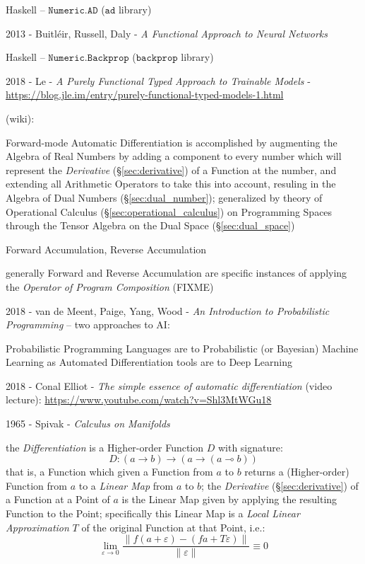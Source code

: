 Haskell -- $\mathtt{Numeric.AD}$ ($\mathtt{ad}$ library)

2013 - Buitl\'eir, Russell, Daly -
\emph{A Functional Approach to Neural Networks}

Haskell -- $\mathtt{Numeric.Backprop}$ ($\mathtt{backprop}$ library)

2018 - Le - \emph{A Purely Functional Typed Approach to Trainable Models} -
\url{https://blog.jle.im/entry/purely-functional-typed-models-1.html}

\asterism

(wiki):

Forward-mode Automatic Differentiation is accomplished by augmenting the Algebra
of Real Numbers by adding a component to every number which will represent the
\emph{Derivative} (\S\ref{sec:derivative}) of a Function at the number, and
extending all Arithmetic Operators to take this into account, resuling in the
Algebra of Dual Numbers (\S\ref{sec:dual_number}); generalized by theory of
Operational Calculus (\S\ref{sec:operational_calculus}) on Programming Spaces
through the Tensor Algebra on the Dual Space (\S\ref{sec:dual_space})

Forward Accumulation, Reverse Accumulation

generally Forward and Reverse Accumulation are specific instances of applying
the \emph{Operator of Program Composition} (FIXME)

2018 - van de Meent, Paige, Yang, Wood -
\emph{An Introduction to Probabilistic Programming} --
two approaches to AI:

Probabilistic Programming Languages are to Probabilistic (or Bayesian) Machine
Learning as Automated Differentiation tools are to Deep Learning

\asterism

2018 - Conal Elliot - \emph{The simple essence of automatic differentiation}
(video lecture): \url{https://www.youtube.com/watch?v=Shl3MtWGu18}

1965 - Spivak - \emph{Calculus on Manifolds}

the \emph{Differentiation} is a Higher-order Function $D$ with signature:
\[
  D : (a \rightarrow b) \rightarrow (a \rightarrow (a \multimap b))
\]
that is, a Function which given a Function from $a$ to $b$ returns a
(Higher-order) Function from $a$ to a \emph{Linear Map} from $a$ to $b$; the
\emph{Derivative} (\S\ref{sec:derivative}) of a Function at a Point of $a$ is
the Linear Map given by applying the resulting Function to the Point;
specifically this Linear Map is a \emph{Local Linear Approximation} $T$ of the
original Function at that Point, i.e.:
\[
  \lim_{\varepsilon \rightarrow 0}
    \frac{\|f (a + \varepsilon) - (f a + T \varepsilon)\|}{\|\varepsilon\|}
    \equiv 0
\]

